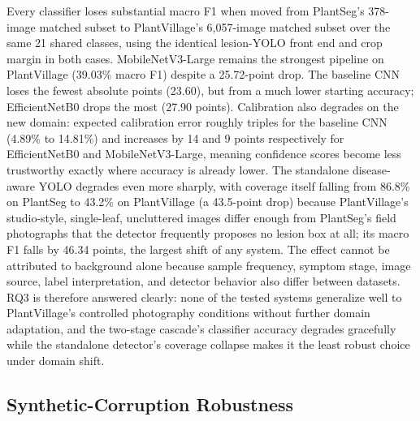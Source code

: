 \documentclass[conference]{IEEEtran}
\begin{document}
Every classifier loses substantial macro F1 when moved from PlantSeg's 378-image matched subset to
PlantVillage's 6,057-image matched subset over the same 21 shared classes, using the identical
lesion-YOLO front end and crop margin in both cases. MobileNetV3-Large remains the strongest
pipeline on PlantVillage (39.03\% macro F1) despite a 25.72-point drop. The baseline CNN loses the
fewest absolute points (23.60), but from a much lower starting accuracy; EfficientNetB0 drops the
most (27.90 points). Calibration also
degrades on the new domain: expected calibration error roughly triples for the baseline CNN (4.89\%
to 14.81\%) and increases by 14 and 9 points respectively for EfficientNetB0 and MobileNetV3-Large,
meaning confidence scores become less trustworthy exactly where accuracy is already lower. The
standalone disease-aware YOLO degrades even more sharply, with coverage itself falling from
86.8\% on PlantSeg to 43.2\% on PlantVillage (a 43.5-point drop) because PlantVillage's
studio-style, single-leaf, uncluttered images differ enough from PlantSeg's field photographs that
the detector frequently proposes no lesion box at all; its macro F1 falls by 46.34 points, the
largest shift of any system. The effect cannot be attributed to background alone because sample
frequency, symptom stage, image source, label interpretation, and detector behavior also differ
between datasets. RQ3 is therefore answered clearly: none of the tested systems generalize well
to PlantVillage's controlled photography conditions without further domain adaptation, and the
two-stage cascade's classifier accuracy degrades gracefully while the standalone detector's
coverage collapse makes it the least robust choice under domain shift.

\subsection{Synthetic-Corruption Robustness}

\begin{table}[t]
\caption{Clean and severity-5 accuracy (\%) on the fixed 200-image PlantSeg robustness subset.
Parentheses contain the absolute change from the clean condition.}
\label{tab:robustness-results}
\centering
{}
\end{table}
\end{document}
